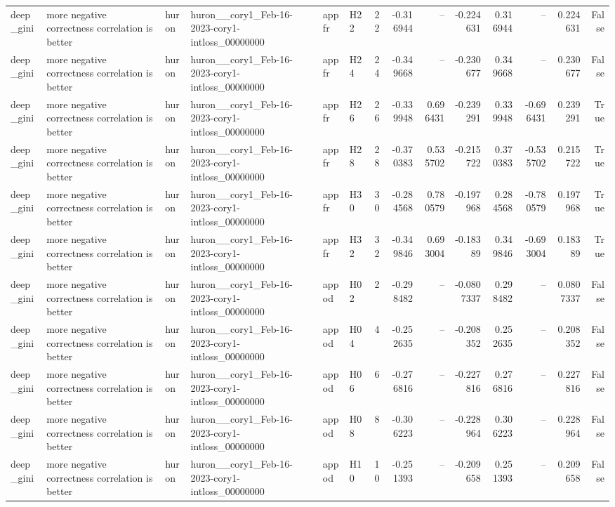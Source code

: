 \begin{longtable}{llllllrrrrrrrr}
deep\_gini & more negative correctness correlation is better & huron & huron\_\_cory1\_Feb-16-2023-cory1-intloss\_00000000 & appfr & H22 & 22 & -0.316944 & -- & -0.224631 & 0.316944 & -- & 0.224631 & False \\
deep\_gini & more negative correctness correlation is better & huron & huron\_\_cory1\_Feb-16-2023-cory1-intloss\_00000000 & appfr & H24 & 24 & -0.349668 & -- & -0.230677 & 0.349668 & -- & 0.230677 & False \\
deep\_gini & more negative correctness correlation is better & huron & huron\_\_cory1\_Feb-16-2023-cory1-intloss\_00000000 & appfr & H26 & 26 & -0.339948 & 0.696431 & -0.239291 & 0.339948 & -0.696431 & 0.239291 & True \\
deep\_gini & more negative correctness correlation is better & huron & huron\_\_cory1\_Feb-16-2023-cory1-intloss\_00000000 & appfr & H28 & 28 & -0.370383 & 0.535702 & -0.215722 & 0.370383 & -0.535702 & 0.215722 & True \\
deep\_gini & more negative correctness correlation is better & huron & huron\_\_cory1\_Feb-16-2023-cory1-intloss\_00000000 & appfr & H30 & 30 & -0.284568 & 0.780579 & -0.197968 & 0.284568 & -0.780579 & 0.197968 & True \\
deep\_gini & more negative correctness correlation is better & huron & huron\_\_cory1\_Feb-16-2023-cory1-intloss\_00000000 & appfr & H32 & 32 & -0.349846 & 0.693004 & -0.18389 & 0.349846 & -0.693004 & 0.18389 & True \\
deep\_gini & more negative correctness correlation is better & huron & huron\_\_cory1\_Feb-16-2023-cory1-intloss\_00000000 & appod & H02 & 2 & -0.298482 & -- & -0.0807337 & 0.298482 & -- & 0.0807337 & False \\
deep\_gini & more negative correctness correlation is better & huron & huron\_\_cory1\_Feb-16-2023-cory1-intloss\_00000000 & appod & H04 & 4 & -0.252635 & -- & -0.208352 & 0.252635 & -- & 0.208352 & False \\
deep\_gini & more negative correctness correlation is better & huron & huron\_\_cory1\_Feb-16-2023-cory1-intloss\_00000000 & appod & H06 & 6 & -0.276816 & -- & -0.227816 & 0.276816 & -- & 0.227816 & False \\
deep\_gini & more negative correctness correlation is better & huron & huron\_\_cory1\_Feb-16-2023-cory1-intloss\_00000000 & appod & H08 & 8 & -0.306223 & -- & -0.228964 & 0.306223 & -- & 0.228964 & False \\
deep\_gini & more negative correctness correlation is better & huron & huron\_\_cory1\_Feb-16-2023-cory1-intloss\_00000000 & appod & H10 & 10 & -0.251393 & -- & -0.209658 & 0.251393 & -- & 0.209658 & False \\

\end{longtable}
